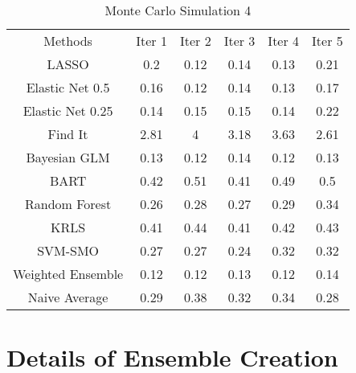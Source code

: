 \documentclass[12pt,letterpaper]{article}
\numberwithin{equation}{section}
\numberwithin{equation}{section}
\begin{document}
\begin{table}[hbt]
\caption{Monte Carlo Simulation 4}
\begin{tabular}{cccccc}
Methods & Iter 1& Iter 2 & Iter 3 & Iter 4 & Iter 5\\
LASSO&0.2&0.12&0.14&0.13&0.21\\ 
Elastic Net 0.5&0.16&0.12&0.14&0.13&0.17\\ 
Elastic Net 0.25&0.14&0.15&0.15&0.14&0.22\\ 
Find It&2.81&4&3.18&3.63&2.61\\ 
Bayesian GLM&0.13&0.12&0.14&0.12&0.13\\ 
BART&0.42&0.51&0.41&0.49&0.5\\ 
Random Forest&0.26&0.28&0.27&0.29&0.34\\ 
KRLS&0.41&0.44&0.41&0.42&0.43\\ 
SVM-SMO&0.27&0.27&0.24&0.32&0.32\\ 
Weighted Ensemble&0.12&0.12&0.13&0.12&0.14\\ 
Naive Average&0.29&0.38&0.32&0.34&0.28\\ 
\end{tabular}
\end{table}

\section{Details of Ensemble Creation} \label{a:ensemble}
\end{document}
